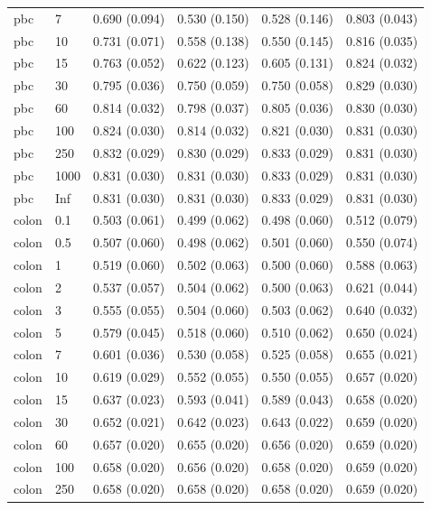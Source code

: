 \begin{tabular}{llllll}
  pbc & 7 & 0.690 (0.094) & 0.530 (0.150) & 0.528 (0.146) & 0.803 (0.043) \\ 
  pbc & 10 & 0.731 (0.071) & 0.558 (0.138) & 0.550 (0.145) & 0.816 (0.035) \\ 
  pbc & 15 & 0.763 (0.052) & 0.622 (0.123) & 0.605 (0.131) & 0.824 (0.032) \\ 
  pbc & 30 & 0.795 (0.036) & 0.750 (0.059) & 0.750 (0.058) & 0.829 (0.030) \\ 
  pbc & 60 & 0.814 (0.032) & 0.798 (0.037) & 0.805 (0.036) & 0.830 (0.030) \\ 
  pbc & 100 & 0.824 (0.030) & 0.814 (0.032) & 0.821 (0.030) & 0.831 (0.030) \\ 
  pbc & 250 & 0.832 (0.029) & 0.830 (0.029) & 0.833 (0.029) & 0.831 (0.030) \\ 
  pbc & 1000 & 0.831 (0.030) & 0.831 (0.030) & 0.833 (0.029) & 0.831 (0.030) \\ 
  pbc & Inf & 0.831 (0.030) & 0.831 (0.030) & 0.833 (0.029) & 0.831 (0.030) \\ 
  colon & 0.1 & 0.503 (0.061) & 0.499 (0.062) & 0.498 (0.060) & 0.512 (0.079) \\ 
  colon & 0.5 & 0.507 (0.060) & 0.498 (0.062) & 0.501 (0.060) & 0.550 (0.074) \\ 
  colon & 1 & 0.519 (0.060) & 0.502 (0.063) & 0.500 (0.060) & 0.588 (0.063) \\ 
  colon & 2 & 0.537 (0.057) & 0.504 (0.062) & 0.500 (0.063) & 0.621 (0.044) \\ 
  colon & 3 & 0.555 (0.055) & 0.504 (0.060) & 0.503 (0.062) & 0.640 (0.032) \\ 
  colon & 5 & 0.579 (0.045) & 0.518 (0.060) & 0.510 (0.062) & 0.650 (0.024) \\ 
  colon & 7 & 0.601 (0.036) & 0.530 (0.058) & 0.525 (0.058) & 0.655 (0.021) \\ 
  colon & 10 & 0.619 (0.029) & 0.552 (0.055) & 0.550 (0.055) & 0.657 (0.020) \\ 
  colon & 15 & 0.637 (0.023) & 0.593 (0.041) & 0.589 (0.043) & 0.658 (0.020) \\ 
  colon & 30 & 0.652 (0.021) & 0.642 (0.023) & 0.643 (0.022) & 0.659 (0.020) \\ 
  colon & 60 & 0.657 (0.020) & 0.655 (0.020) & 0.656 (0.020) & 0.659 (0.020) \\ 
  colon & 100 & 0.658 (0.020) & 0.656 (0.020) & 0.658 (0.020) & 0.659 (0.020) \\ 
  colon & 250 & 0.658 (0.020) & 0.658 (0.020) & 0.658 (0.020) & 0.659 (0.020) \\ 

\end{tabular}
